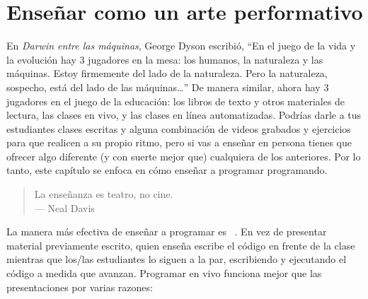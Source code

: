 \chapter{Enseñar como un arte performativo}\label{s:performance}

En \emph{Darwin entre las máquinas},
George Dyson escribió,
``En el juego de la vida y la evolución hay 3 jugadores en la mesa:
los humanos, la naturaleza y las máquinas.
Estoy firmemente del lado de la naturaleza.
Pero la naturaleza, sospecho, está del lado de las máquinas{\ldots}''
De manera similar, ahora hay 3 jugadores en el juego de la educación:
los libros de texto y otros materiales de lectura,
las clases en vivo,
y las clases en línea automatizadas.
Podrías darle a tus estudiantes clases escritas y alguna combinación
de videos grabados y ejercicios para que realicen a su propio ritmo,
pero si vas a enseñar en persona tienes
que ofrecer algo diferente (y con suerte mejor que) cualquiera de los anteriores.
Por lo tanto, este capítulo se enfoca en cómo enseñar a programar programando.


\begin{quote}

  La enseñanza es teatro, no cine. \\
  --- Neal Davis

\end{quote}

La manera más efectiva de enseñar a programar es ~\cite{Rubi2013,Haar2017,Raj2018}.
En vez de presentar material previamente escrito,
quien enseña escribe el código en frente de la clase
mientras que los/las estudiantes lo siguen a la par,
escribiendo y ejecutando el código a medida que avanzan.
Programar en vivo funciona mejor que las presentaciones por varias razones:


